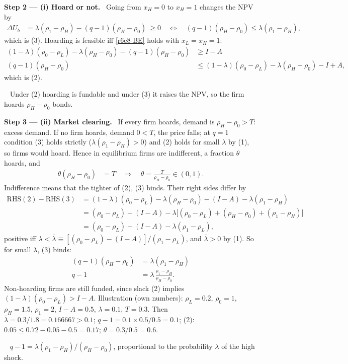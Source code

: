 \documentclass[11pt,a4paper]{article}
\newcommand{\step}[2]{\par\medskip\noindent\textbf{Step #1 --- #2.}~}
\newcommand{\answer}[1]{\par\smallskip\noindent\fbox{\textbf{Answer #1.}}~}
\begin{document}
\step{2}{(i) Hoard or not} Going from $x_H=0$ to $x_H=1$ changes the NPV by
\begin{align}
  \Delta U_b &= \lambda(\rho_1-\rho_H)-(q-1)(\rho_H-\rho_0)\ \ge 0 \quad\Longleftrightarrow\quad (q-1)(\rho_H-\rho_0)\le\lambda(\rho_1-\rho_H), \nonumber
\end{align}
which is (3). Hoarding is feasible iff \eqref{r6e8-BE} holds with $x_L=x_H=1$:
\begin{align}
  (1-\lambda)(\rho_0-\rho_L)-\lambda(\rho_H-\rho_0)-(q-1)(\rho_H-\rho_0) &\ge I-A \nonumber\\
  (q-1)(\rho_H-\rho_0) &\le (1-\lambda)(\rho_0-\rho_L)-\lambda(\rho_H-\rho_0)-I+A, \nonumber
\end{align}
which is (2).
\answer{(i)} Under (2) hoarding is fundable and under (3) it raises the NPV, so the firm hoards $\rho_H-\rho_0$ bonds.

\step{3}{(ii) Market clearing} If every firm hoards, demand is $\rho_H-\rho_0>T$: excess demand. If no firm hoards, demand $0<T$, the price falls; at $q=1$ condition (3) holds strictly ($\lambda(\rho_1-\rho_H)>0$) and (2) holds for small $\lambda$ by (1), so firms would hoard. Hence in equilibrium firms are indifferent, a fraction $\theta$ hoards, and
\begin{align}
  \theta(\rho_H-\rho_0) &= T \quad\Longrightarrow\quad \theta=\frac{T}{\rho_H-\rho_0}\in(0,1). \nonumber
\end{align}
Indifference means that the tighter of (2), (3) binds. Their right sides differ by
\begin{align}
  \text{RHS}(2)-\text{RHS}(3) &= (1-\lambda)(\rho_0-\rho_L)-\lambda(\rho_H-\rho_0)-(I-A)-\lambda(\rho_1-\rho_H) \nonumber\\
  &= (\rho_0-\rho_L)-(I-A)-\lambda\big[(\rho_0-\rho_L)+(\rho_H-\rho_0)+(\rho_1-\rho_H)\big] \nonumber\\
  &= (\rho_0-\rho_L)-(I-A)-\lambda(\rho_1-\rho_L), \nonumber
\end{align}
positive iff $\lambda<\bar\lambda\equiv[(\rho_0-\rho_L)-(I-A)]/(\rho_1-\rho_L)$, and $\bar\lambda>0$ by (1). So for small $\lambda$, (3) binds:
\begin{align}
  (q-1)(\rho_H-\rho_0) &= \lambda(\rho_1-\rho_H) \nonumber\\
  q-1 &= \lambda\,\frac{\rho_1-\rho_H}{\rho_H-\rho_0}. \label{r6e8-q}
\end{align}
Non-hoarding firms are still funded, since slack (2) implies $(1-\lambda)(\rho_0-\rho_L)>I-A$.
Illustration (own numbers): $\rho_L=0.2$, $\rho_0=1$, $\rho_H=1.5$, $\rho_1=2$, $I-A=0.5$, $\lambda=0.1$, $T=0.3$. Then $\bar\lambda=0.3/1.8=0.166667>0.1$; $q-1=0.1\times0.5/0.5=0.1$; (2): $0.05\le0.72-0.05-0.5=0.17$; $\theta=0.3/0.5=0.6$.
\answer{(ii)} $q-1=\lambda(\rho_1-\rho_H)/(\rho_H-\rho_0)$, proportional to the probability $\lambda$ of the high shock.
\end{document}
